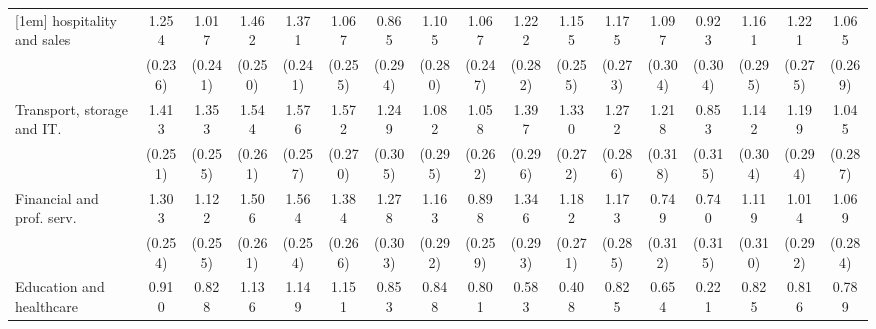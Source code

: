 {\begin{tabular}{l*{16}{c}}
[1em]
hospitality and sales&       1.254\sym{***}&       1.017\sym{***}&       1.462\sym{***}&       1.371\sym{***}&       1.067\sym{***}&       0.865\sym{**} &       1.105\sym{***}&       1.067\sym{***}&       1.222\sym{***}&       1.155\sym{***}&       1.175\sym{***}&       1.097\sym{***}&       0.923\sym{**} &       1.161\sym{***}&       1.221\sym{***}&       1.065\sym{***}\\
                    &     (0.236)         &     (0.241)         &     (0.250)         &     (0.241)         &     (0.255)         &     (0.294)         &     (0.280)         &     (0.247)         &     (0.282)         &     (0.255)         &     (0.273)         &     (0.304)         &     (0.304)         &     (0.295)         &     (0.275)         &     (0.269)         \\
[1em]
Transport, storage and IT.&       1.413\sym{***}&       1.353\sym{***}&       1.544\sym{***}&       1.576\sym{***}&       1.572\sym{***}&       1.249\sym{***}&       1.082\sym{***}&       1.058\sym{***}&       1.397\sym{***}&       1.330\sym{***}&       1.272\sym{***}&       1.218\sym{***}&       0.853\sym{**} &       1.142\sym{***}&       1.199\sym{***}&       1.045\sym{***}\\
                    &     (0.251)         &     (0.255)         &     (0.261)         &     (0.257)         &     (0.270)         &     (0.305)         &     (0.295)         &     (0.262)         &     (0.296)         &     (0.272)         &     (0.286)         &     (0.318)         &     (0.315)         &     (0.304)         &     (0.294)         &     (0.287)         \\
[1em]
Financial and prof. serv.&       1.303\sym{***}&       1.122\sym{***}&       1.506\sym{***}&       1.564\sym{***}&       1.384\sym{***}&       1.278\sym{***}&       1.163\sym{***}&       0.898\sym{***}&       1.346\sym{***}&       1.182\sym{***}&       1.173\sym{***}&       0.749\sym{*}  &       0.740\sym{*}  &       1.119\sym{***}&       1.014\sym{***}&       1.069\sym{***}\\
                    &     (0.254)         &     (0.255)         &     (0.261)         &     (0.254)         &     (0.266)         &     (0.303)         &     (0.292)         &     (0.259)         &     (0.293)         &     (0.271)         &     (0.285)         &     (0.312)         &     (0.315)         &     (0.310)         &     (0.292)         &     (0.284)         \\
[1em]
Education and healthcare&       0.910\sym{***}&       0.828\sym{**} &       1.136\sym{***}&       1.149\sym{***}&       1.151\sym{***}&       0.853\sym{*}  &       0.848\sym{**} &       0.801\sym{**} &       0.583         &       0.408         &       0.825\sym{*}  &       0.654         &       0.221         &       0.825\sym{*}  &       0.816\sym{*}  &       0.789\sym{*}  \\

\end{tabular}}

